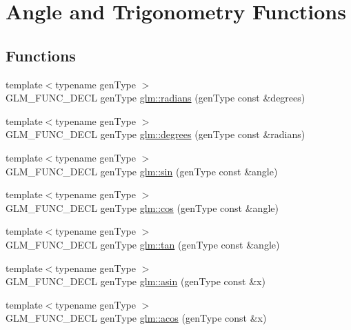 \hypertarget{group__core__func__trigonometric}{\section{Angle and Trigonometry Functions}
\label{group__core__func__trigonometric}
}
\subsection*{Functions}
\begin{DoxyCompactItemize}
\item 
{\footnotesize template$<$typename gen\-Type $>$ }\\G\-L\-M\-\_\-\-F\-U\-N\-C\-\_\-\-D\-E\-C\-L gen\-Type \hyperlink{group__core__func__trigonometric_ga431d31cdb060059bc5b0696e212f1453}{glm\-::radians} (gen\-Type const \&degrees)
\item 
{\footnotesize template$<$typename gen\-Type $>$ }\\G\-L\-M\-\_\-\-F\-U\-N\-C\-\_\-\-D\-E\-C\-L gen\-Type \hyperlink{group__core__func__trigonometric_gaf4e5661bd1c993f6090d49e988a4c78a}{glm\-::degrees} (gen\-Type const \&radians)
\item 
{\footnotesize template$<$typename gen\-Type $>$ }\\G\-L\-M\-\_\-\-F\-U\-N\-C\-\_\-\-D\-E\-C\-L gen\-Type \hyperlink{group__core__func__trigonometric_gafbab21016b7f3bc21afb09a7e42e2df1}{glm\-::sin} (gen\-Type const \&angle)
\item 
{\footnotesize template$<$typename gen\-Type $>$ }\\G\-L\-M\-\_\-\-F\-U\-N\-C\-\_\-\-D\-E\-C\-L gen\-Type \hyperlink{group__core__func__trigonometric_gac6708d4f0895dc79b65f50db00840167}{glm\-::cos} (gen\-Type const \&angle)
\item 
{\footnotesize template$<$typename gen\-Type $>$ }\\G\-L\-M\-\_\-\-F\-U\-N\-C\-\_\-\-D\-E\-C\-L gen\-Type \hyperlink{group__core__func__trigonometric_ga328aeb0de4f312dc3d200cb929715d44}{glm\-::tan} (gen\-Type const \&angle)
\item 
{\footnotesize template$<$typename gen\-Type $>$ }\\G\-L\-M\-\_\-\-F\-U\-N\-C\-\_\-\-D\-E\-C\-L gen\-Type \hyperlink{group__core__func__trigonometric_gafca5e8c71ea06be0840227b4aafc5680}{glm\-::asin} (gen\-Type const \&x)
\item 
{\footnotesize template$<$typename gen\-Type $>$ }\\G\-L\-M\-\_\-\-F\-U\-N\-C\-\_\-\-D\-E\-C\-L gen\-Type \hyperlink{group__core__func__trigonometric_gac85497ed2e39d4cac4ac32bed4dfc506}{glm\-::acos} (gen\-Type const \&x)

\end{DoxyCompactItemize}
